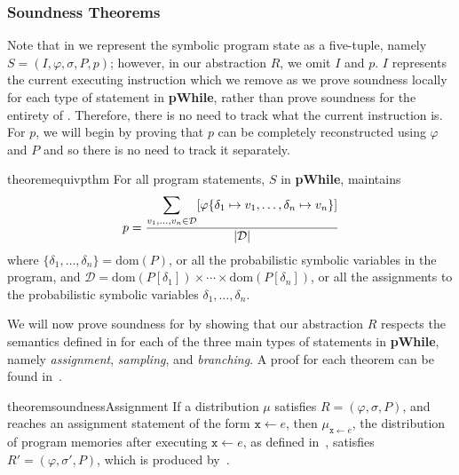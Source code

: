 \documentclass[acmsmall,review,anonymous]{acmart}\settopmatter{printfolios=true,printccs=false,printacmref=false}
\DeclarePairedDelimiter{\abs}{\lvert}{\rvert}
\newcommand*\dom[1]{\mathrm{dom}\left( #1 \right)}
\begin{document}
\subsubsection{Soundness Theorems}
\label{sec:proofs}

Note that in  we represent the symbolic program state as a five-tuple, namely $S = (I, \varphi, \sigma, P, p)$; however, in our abstraction $R$, we omit $I$ and $p$.
% 
$I$ represents the current executing instruction which we remove as we prove soundness locally for each type of statement in \textbf{pWhile}, rather than prove soundness for the entirety of .
% 
Therefore, there is no need to track what the current instruction is.
% 
For $p$, we will begin by proving that $p$ can be completely reconstructed using $\varphi$ and $P$ and so there is no need to track it separately.
\begin{restatable}{theorem}{equivpthm}
  For all program statements, $S$ in \textbf{pWhile},  maintains
  \[
    p = \frac{\displaystyle\sum_{v_1,\ldots,v_n \in \mathcal{D}} [ \varphi\{\delta_1 \mapsto v_1, \ldots, \delta_n \mapsto v_n\} ]}{\abs{\mathcal{D}}}
  \]
  where $\{\delta_1,\ldots,\delta_n\} = \dom{P}$, or all the probabilistic symbolic variables in the program, and $\mathcal{D} = \dom{P[\delta_1]} \times \cdots \times \dom{P[\delta_n]}$, or all the assignments to the probabilistic symbolic variables $\delta_1,\ldots,\delta_n$.
\end{restatable}

We will now prove soundness for  by showing that our abstraction $R$ respects the semantics defined in  for each of the three main types of statements in \textbf{pWhile}, namely \textit{assignment}, \textit{sampling}, and \textit{branching}. A proof for each theorem can be found in~.

\begin{restatable}{theorem}{soundnessAssignment}
  If a distribution $\mu$ satisfies $R=(\varphi,\sigma,P)$, and~ reaches an assignment statement of the form $\mathtt{x} \gets e$, then $\mu_{\mathtt{x}\gets e}$, the distribution of program memories after executing $\mathtt{x} \gets e$, as defined in~,  satisfies $R'=(\varphi,\sigma',P)$, which is produced by~.
\end{restatable}
\end{document}
